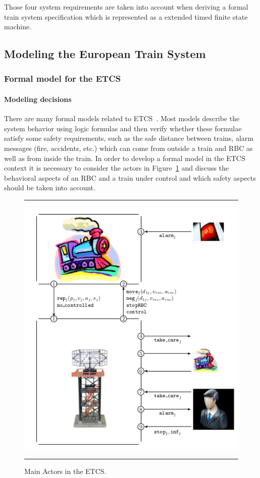 \documentclass{template/openetcs_article}
\begin{document}
Those four system requirements are taken into account when deriving a formal train system specification which is represented as a extended timed finite state machine.

\subsection{Modeling the European Train System}\label{sec2}

\subsubsection{Formal model for the ETCS}\label{subsec3.1}

\paragraph{Modeling decisions} 

There are many formal models related to ETCS~\cite{pjesh01,zh05,Ammann2011,ltlzx11,Feuser2012}. Most models describe the system behavior using logic formulas and then verify whether these formulae satisfy some safety requirements, such as the safe distance between trains, alarm messages (fire, accidents, etc.) which can come from outside a train and RBC as well as from inside the train. In order to develop a formal model in the ETCS context it is necessary to consider the actors in Figure~\ref{fig:model} and discuss the behavioral aspects of an RBC and a train under control and which safety aspects should be taken into account. 

\begin{figure}[t!]
\hrule
\sspace

\begin{center}
  \includegraphics[width=.5\textwidth]{figures/ETCSModel.png}
  \caption{Main Actors in the ETCS.}
  \label{fig:model}
\end{center}
\sspace
\hrule
\end{figure}
\end{document}
